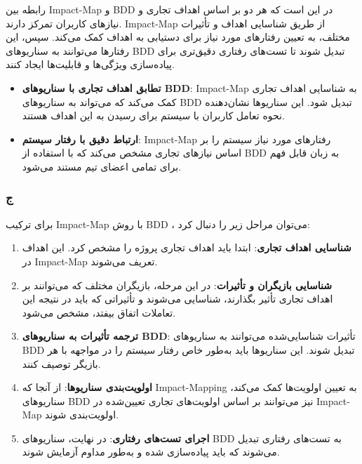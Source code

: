 رابطه بین Impact-Map و BDD در این است که هر دو بر اساس اهداف تجاری و نیازهای کاربران تمرکز دارند. Impact-Map از طریق شناسایی اهداف و تأثیرات مختلف، به تعیین رفتارهای مورد نیاز برای دستیابی به اهداف کمک می‌کند. سپس، این رفتارها می‌توانند به سناریوهای BDD تبدیل شوند تا تست‌های رفتاری دقیق‌تری برای پیاده‌سازی ویژگی‌ها و قابلیت‌ها ایجاد کنند.

\begin{itemize}
    \item \textbf{تطابق اهداف تجاری با سناریوهای BDD}: Impact-Map به شناسایی اهداف تجاری کمک می‌کند که می‌تواند به سناریوهای BDD تبدیل شود. این سناریوها نشان‌دهنده نحوه تعامل کاربران با سیستم برای رسیدن به این اهداف هستند.
    \item \textbf{ارتباط دقیق با رفتار سیستم}: Impact-Map رفتارهای مورد نیاز سیستم را بر اساس نیازهای تجاری مشخص می‌کند که با استفاده از BDD به زبان قابل فهم برای تمامی اعضای تیم مستند می‌شود.
\end{itemize}

\pagebreak
\subsubsection*{ج}

برای ترکیب Impact-Map با روش BDD ، می‌توان مراحل زیر را دنبال کرد:

\begin{enumerate}
    \item \textbf{شناسایی اهداف تجاری}: ابتدا باید اهداف تجاری پروژه را مشخص کرد. این اهداف در Impact-Map تعریف می‌شوند.
    \item \textbf{شناسایی بازیگران و تأثیرات}: در این مرحله، بازیگران مختلف که می‌توانند بر اهداف تجاری تأثیر بگذارند، شناسایی می‌شوند و تأثیراتی که باید در نتیجه این تعاملات اتفاق بیفتد، مشخص می‌شود.
    \item \textbf{ترجمه تأثیرات به سناریوهای BDD}: تأثیرات شناسایی‌شده می‌توانند به سناریوهای BDD تبدیل شوند. این سناریوها باید به‌طور خاص رفتار سیستم را در مواجهه با هر بازیگر توصیف کنند.
    \item \textbf{اولویت‌بندی سناریوها}: از آنجا که Impact-Mapping به تعیین اولویت‌ها کمک می‌کند، سناریوهای BDD نیز می‌توانند بر اساس اولویت‌های تجاری تعیین‌شده در Impact-Map اولویت‌بندی شوند.
    \item \textbf{اجرای تست‌های رفتاری}: در نهایت، سناریوهای BDD به تست‌های رفتاری تبدیل می‌شوند که باید پیاده‌سازی شده و به‌طور مداوم آزمایش شوند.
\end{enumerate}
